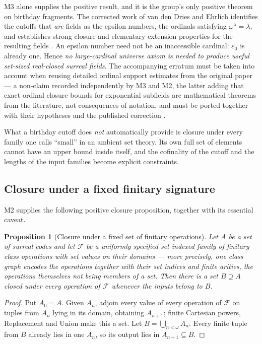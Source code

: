 \documentclass[11pt,letterpaper]{article}
\numberwithin{equation}{section}
\newtheorem{proposition}[theorem]{Proposition}
\theoremstyle{definition}
\theoremstyle{remark}
\begin{document}
M3 alone supplies the positive result, and it is the group's only positive
theorem on birthday fragments. The corrected work of van den Dries and Ehrlich
identifies the cutoffs that \emph{are} fields as the epsilon numbers, the
ordinals satisfying $\omega^\lambda=\lambda$, and establishes strong closure and
elementary-extension properties for the resulting fields
\cite{found:vdDE,found:vdDEerratum}. An epsilon number need not be an
inaccessible cardinal: $\varepsilon_0$ is already one. Hence \emph{no
large-cardinal universe axiom is needed to produce useful set-sized real-closed
surreal fields}. The accompanying erratum must be taken into account when
reusing detailed ordinal support estimates from the original paper --- a
non-claim recorded independently by M3 and M2, the latter adding that exact
ordinal closure bounds for exponential subfields are mathematical theorems from
the literature, not consequences of notation, and must be ported together with
their hypotheses and the published correction
\cite{found:EhrlichKaplanExp}.

What a birthday cutoff does \emph{not} automatically provide is closure under
every family one calls ``small'' in an ambient set theory. Its own full set of
elements cannot have an upper bound inside itself, and the cofinality of the
cutoff and the lengths of the input families become explicit constraints.

\subsection{Closure under a fixed finitary signature}
\label{found:sub:closure}
M2 supplies the following positive closure proposition, together with its
essential caveat.

\begin{proposition}[Closure under a fixed set of finitary operations]\label{found:prop:closure}
Let $A$ be a set of surreal codes and let $\mathcal F$ be a uniformly specified
set-indexed family of finitary class operations with set values on their
domains --- more precisely, one class graph encodes the operations together
with their set indices and finite arities, the operations themselves not being
members of a set. Then there is a set $B\supseteq A$ closed under every
operation of $\mathcal F$ whenever the inputs belong to $B$.
\end{proposition}
\begin{proof}
Put $A_0=A$. Given $A_n$, adjoin every value of every operation of $\mathcal F$
on tuples from $A_n$ lying in its domain, obtaining $A_{n+1}$; finite Cartesian
powers, Replacement and Union make this a set. Let $B=\bigcup_{n<\omega}A_n$.
Every finite tuple from $B$ already lies in one $A_n$, so its output lies in
$A_{n+1}\subseteq B$.
\end{proof}
\end{document}
